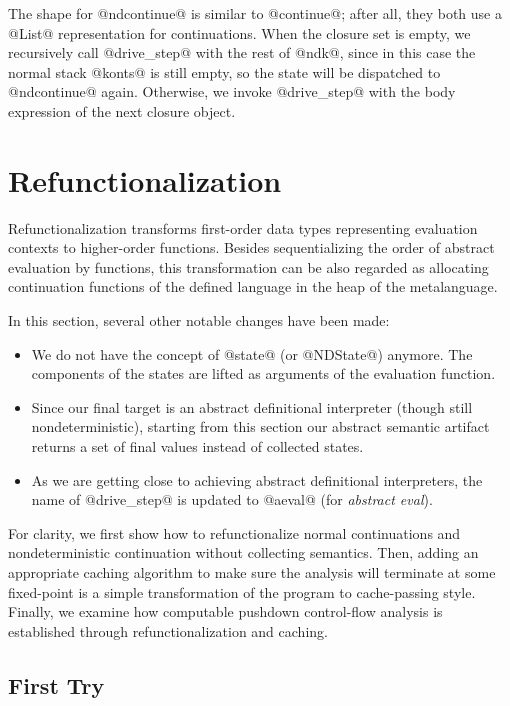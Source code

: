 \documentclass[acmsmall]{acmart}\settopmatter{}
\begin{document}
The shape for @ndcontinue@ is similar to @continue@; after
all, they both use a @List@ representation for continuations.
When the closure set is empty, we recursively call @drive_step@ with the rest
of @ndk@, since in this case the normal stack @konts@ is still empty, so
the state will be dispatched to @ndcontinue@ again.
Otherwise, we invoke @drive_step@ with the body expression of the next closure object.

\section{Refunctionalization} \label{sec:refunc}

Refunctionalization transforms first-order data types representing
evaluation contexts to higher-order functions.
Besides sequentializing the order of abstract evaluation by functions,
this transformation can be also regarded as allocating continuation functions of
the defined language in the heap of the metalanguage.

In this section, several other notable changes have been made:
\begin{itemize}
\item We do not have the concept of @state@ (or @NDState@) anymore.
The components of the states are lifted as arguments of the evaluation
function.
\item Since our final target is an abstract definitional interpreter (though still
nondeterministic), starting from this section our abstract semantic artifact
returns a set of final values instead of collected states.
\item As we are getting close to achieving
abstract definitional interpreters, the name of @drive_step@ is updated to
@aeval@ (for \emph{abstract eval}).
\end{itemize}

For clarity, we first show how to refunctionalize normal continuations and
nondeterministic continuation without collecting semantics.
Then, adding an appropriate caching algorithm to make sure the analysis will
terminate at some fixed-point is a simple transformation of the program to cache-passing
style. Finally, we examine how computable pushdown control-flow analysis is established
through refunctionalization and caching.

\subsection{First Try}
\end{document}
